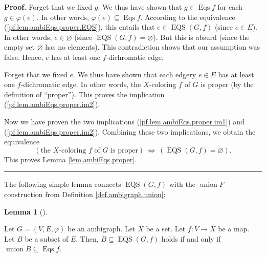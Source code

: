 \documentclass[numbers=enddot,12pt,final,onecolumn,notitlepage]{scrartcl}%
\theoremstyle{definition}
\newtheorem{lem}[theo]{Lemma}
\newenvironment{lemma}[1][]
{\begin{lem}[#1]\begin{leftbar}}
{\end{leftbar}\end{lem}}
\newenvironment{proof}[1][Proof]{\noindent\textbf{#1.} }{\ \rule{0.5em}{0.5em}}
\newenvironment{verlong}{}{}
\begin{document}
\begin{verlong}
\begin{proof}
Forget that we fixed $g$. We thus have shown that $g\in\operatorname*{Eqs}f$
for each $g\in\varphi\left(  e\right)  $. In other words, $\varphi\left(
e\right)  \subseteq\operatorname*{Eqs}f$. According to the equivalence
(\ref{pf.lem.ambiEqs.proper.EQS}), this entails that $e\in\operatorname*{EQS}%
\left(  G,f\right)  $ (since $e\in E$). In other words, $e\in\varnothing$
(since $\operatorname*{EQS}\left(  G,f\right)  =\varnothing$). But this is
absurd (since the empty set $\varnothing$ has no elements). This contradiction
shows that our assumption was false. Hence, $e$ has at least one
$f$-dichromatic edge.

Forget that we fixed $e$. We thus have shown that each edgery $e\in E$ has at
least one $f$-dichromatic edge. In other words, the $X$-coloring $f$ of $G$ is
proper (by the definition of \textquotedblleft proper\textquotedblright). This
proves the implication (\ref{pf.lem.ambiEqs.proper.im2}).

Now we have proven the two implications (\ref{pf.lem.ambiEqs.proper.im1}) and
(\ref{pf.lem.ambiEqs.proper.im2}). Combining these two implications, we obtain
the equivalence%
\[
\left(  \text{the }X\text{-coloring }f\text{ of }G\text{ is proper}\right)
\ \Longleftrightarrow\ \left(  \operatorname*{EQS}\left(  G,f\right)
=\varnothing\right)  .
\]
This proves Lemma \ref{lem.ambiEqs.proper}.
\end{proof}
\end{verlong}

The following simple lemma connects $\operatorname*{EQS}\left(  G,f\right)  $
with the $\operatorname*{union}F$ construction from Definition
\ref{def.ambigraph.union}:

\begin{lemma}
\label{lem.ambiEqs.union}Let $G=\left(  V,E,\varphi\right)  $ be an ambigraph.
Let $X$ be a set. Let $f:V\rightarrow X$ be a map. Let $B$ be a subset of $E$.
Then, $B\subseteq\operatorname*{EQS}\left(  G,f\right)  $ holds if and only if
$\operatorname*{union}B\subseteq\operatorname*{Eqs}f$.
\end{lemma}
\end{document}
